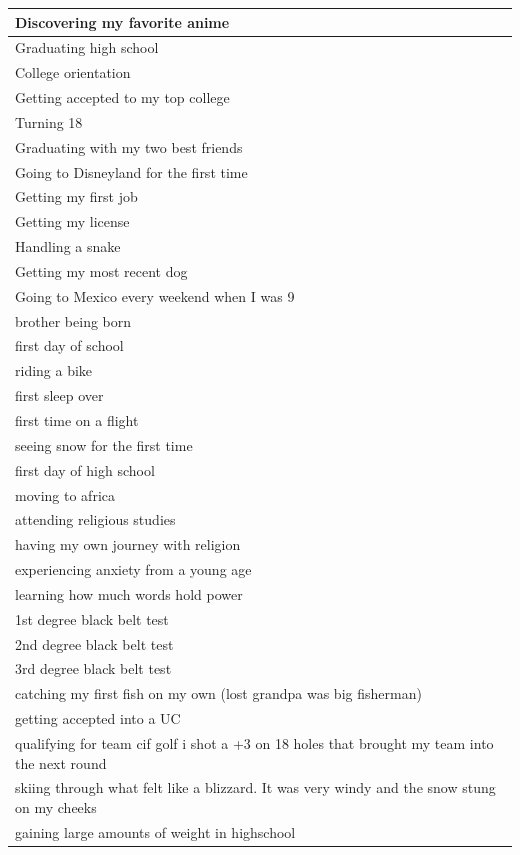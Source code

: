\documentclass[
  .7em,
  letterpaper,
  DIV=11,
  numbers=noendperiod]{scrartcl}
\begin{document}
\begin{table}
\begin{tabular}{l}
\hline
Discovering my favorite anime\\
\hline
Graduating high school\\
\hline
College orientation\\
\hline
Getting accepted to my top college\\
\hline
Turning 18\\
\hline
Graduating with my two best friends\\
\hline
Going to Disneyland for the first time\\
\hline
Getting my first job\\
\hline
Getting my license\\
\hline
Handling a snake\\
\hline
Getting my most recent dog\\
\hline
Going to Mexico every weekend when I was 9\\
\hline
brother being born\\
\hline
first day of school\\
\hline
riding a bike\\
\hline
first sleep over\\
\hline
first time on a flight\\
\hline
seeing snow for the first time\\
\hline
first day of high school\\
\hline
moving to africa\\
\hline
attending religious studies\\
\hline
having my own journey with religion\\
\hline
experiencing anxiety from a young age\\
\hline
learning how much words hold power\\
\hline
1st degree black belt test\\
\hline
2nd degree black belt test\\
\hline
3rd degree black belt test\\
\hline
catching my first fish on my own (lost grandpa was big fisherman)\\
\hline
getting accepted into a UC\\
\hline
qualifying for team cif golf i shot a +3 on 18 holes that brought my team into the next round\\
\hline
skiing through what felt like a blizzard. It was very windy and the snow stung on my cheeks\\
\hline
gaining large amounts of weight in highschool\\
\hline

\end{tabular}
\end{table}
\end{document}
